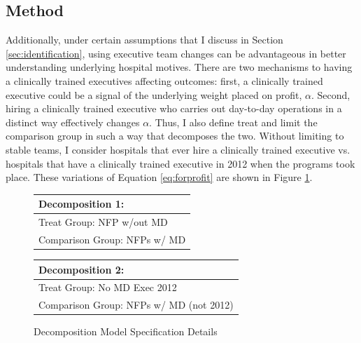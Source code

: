 \documentclass[12pt]{article}
\begin{document}
\subsection{Method}

Additionally, under certain assumptions that I discuss in Section \ref{sec:identification}, using executive team changes can be advantageous in better understanding underlying hospital motives. There are two mechanisms to having a clinically trained executives affecting outcomes: first, a clinically trained executive could be a signal of the underlying weight placed on profit, $\alpha$. Second, hiring a clinically trained executive who carries out day-to-day operations in a distinct way effectively changes $\alpha$. Thus, I also define treat and limit the comparison group in such a way that decomposes the two. Without limiting to stable teams, I consider hospitals that ever hire a clinically trained executive vs. hospitals that have a clinically trained executive in 2012 when the programs took place. These variations of Equation \ref{eq:forprofit} are shown in Figure \ref{fig:decomp_spec}.

\begin{figure}[ht!]
\begin{center}
\caption{\label{fig:decomp_spec}Decomposition Model Specification Details}
 
 \begin{tabular}{| m{18em} |}
 \hline
 Decomposition 1:\\ [0.5ex]
 \hline\hline 
 \vspace{2mm}
 Treat Group:  \hspace{15mm} NFP w/out MD \\
 \vspace{2mm}
 Comparison Group: \hspace{3mm} NFPs w/ MD  \\
 [1ex]
 \hline
 \end{tabular}
\hfil   %
 \begin{tabular}{|m{18em}|}
 \hline
 Decomposition 2:\\ [0.5ex]
 \hline\hline
 \vspace{2mm}
 Treat Group: \hspace{11mm} No MD Exec 2012 \\
 \vspace{2mm}
 Comparison Group:  NFPs w/ MD (not 2012)  \\
 [1ex]
 \hline
 \end{tabular}
 
\end{center}
 \end{figure}
\end{document}
